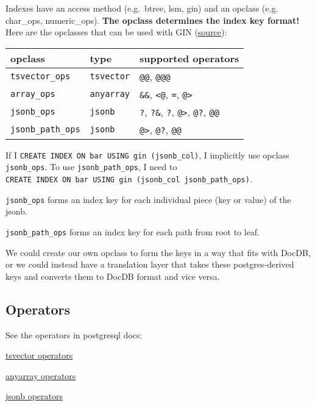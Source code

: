 \documentclass[11pt]{article}
\begin{document}
Indexes have an access method (e.g.~btree, lsm, gin) and an opclass
(e.g. char\_ops, numeric\_ops). \textbf{The opclass determines the index
key format!} Here are the opclasses that can be used with GIN
(\href{https://www.postgresql.org/docs/current/gin-builtin-opclasses.html}{source}):

\begin{center}
    \begin{tabular}{lll}
        \toprule
        opclass & type & supported operators \\
        \midrule
        \texttt{tsvector\_ops} & \texttt{tsvector} & \texttt{@@},
        \texttt{@@@} \\
        \texttt{array\_ops} & \texttt{anyarray} & \texttt{\&\&},
        \texttt{\textless{}@}, \texttt{=}, \texttt{@\textgreater{}} \\
        \texttt{jsonb\_ops} & \texttt{jsonb} & \texttt{?}, \texttt{?\&},
        \texttt{?\textbar{}}, \texttt{@\textgreater{}}, \texttt{@?},
        \texttt{@@} \\
        \texttt{jsonb\_path\_ops} & \texttt{jsonb} & \texttt{@\textgreater{}},
        \texttt{@?}, \texttt{@@} \\
        \bottomrule
    \end{tabular}
\end{center}

If I \texttt{CREATE\ INDEX\ ON\ bar\ USING\ gin\ (jsonb\_col)}, I
implicitly use opclass \texttt{jsonb\_ops}. To use
\texttt{jsonb\_path\_ops}, I need to
\texttt{CREATE\ INDEX\ ON\ bar\ USING\ gin\ (jsonb\_col\ jsonb\_path\_ops)}.

\texttt{jsonb\_ops} forms an index key for each individual piece (key or
value) of the jsonb.

\texttt{jsonb\_path\_ops} forms an index key for each path from root to
leaf.

We could create our own opclass to form the keys in a way that fits with
DocDB, or we could instead have a translation layer that takes these
postgres-derived keys and converts them to DocDB format and vice versa.

\hypertarget{operators}{%
\subsection{Operators}\label{operators}}

See the operators in postgresql docs:

\begin{oparts}
\item
  \href{https://www.postgresql.org/docs/current/functions-textsearch.html}{tsvector
  operators}
\item
  \href{https://www.postgresql.org/docs/current/functions-array.html}{anyarray
  operators}
\item
  \href{https://www.postgresql.org/docs/current/functions-json.html}{jsonb
  operators}
\end{oparts}
\end{document}
